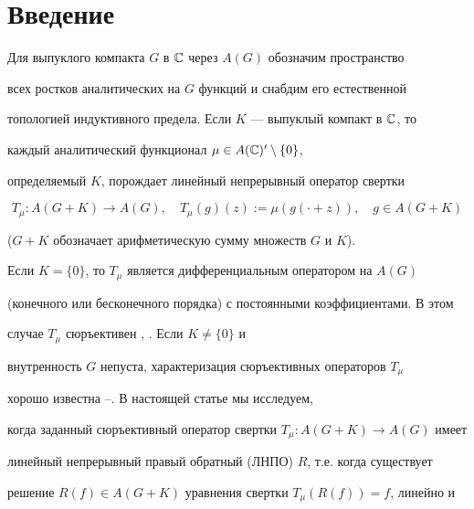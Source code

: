 \date{} 


\pagestyle{plain} 


 


 


\maketitle 


 


\section*{Введение} 


 


Для выпуклого компакта $G$ в $\Bbb C$ через $A(G)$ обозначим пространство 


всех ростков аналитических на $G$ функций и снабдим его естественной 


топологией индуктивного предела. Если $K$ --- выпуклый компакт в $\Bbb C$, то 


каждый аналитический функционал $\mu\in A(\Bbb C)'\setminus\{0\}$, 


определяемый $K$, порождает линейный непрерывный оператор свертки 


$$ 


T_\mu :A(G+K)\to A(G),\quad T_\mu(g)(z):=\mu(g(\cdot +z)),\quad 


g\in A(G+K) 


$$ 


($G+K$ обозначает арифметическую сумму множеств $G$ и $K$). 


Если $K=\{0\}$, то $T_\mu$ является дифференциальным оператором на $A(G)$ 


(конечного или бесконечного порядка) с постоянными коэффициентами. В этом 


случае $T_\mu$ сюръективен \cite{Mart}, \cite{Kor1}. Если $K\ne\{0\}$ и 


внутренность $G$ непуста, характеризация сюръективных операторов $T_\mu$ 


хорошо известна \cite{Mor}--\cite{Momm1}. В настоящей статье мы исследуем, 


когда заданный сюръективный оператор свертки $T_\mu :A(G+K)\to A(G)$ имеет 


линейный непрерывный правый обратный (ЛНПО) $R$, т.е. когда существует 


решение $R(f)\in A(G+K)$ уравнения свертки $T_\mu(R(f))=f$, линейно и 


